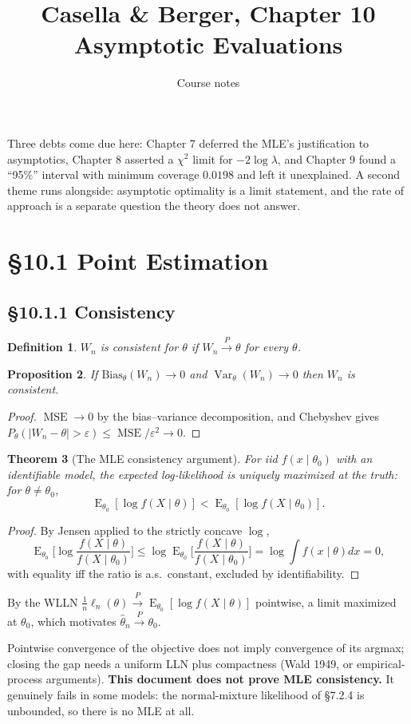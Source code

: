 \documentclass[11pt]{article}
\title{Casella \& Berger, Chapter 10\\[2pt]\large Asymptotic Evaluations}
\author{Course notes}\date{}
\newtheorem{theorem}{Theorem}[section]
\newtheorem{definition}[theorem]{Definition}
\newtheorem{proposition}[theorem]{Proposition}
\DeclareMathOperator{\Var}{Var}\DeclareMathOperator{\E}{E}
\DeclareMathOperator{\MSE}{MSE}
\newcommand{\convP}{\xrightarrow{P}}\newcommand{\convD}{\xrightarrow{d}}
\begin{document}
\maketitle

Three debts come due here: Chapter 7 deferred the MLE's justification to asymptotics, Chapter 8 asserted a $\chi^2$ limit for $-2\log\lambda$, and Chapter 9 found a ``95\%'' interval with minimum coverage $0.0198$ and left it unexplained. A second theme runs alongside: asymptotic optimality is a limit statement, and the rate of approach is a separate question the theory does not answer.

\section{\S10.1 Point Estimation}
\subsection{\S10.1.1 Consistency}
\begin{definition}
$W_n$ is consistent for $\theta$ if $W_n\convP\theta$ for every $\theta$.
\end{definition}
\begin{proposition}
If $\mathrm{Bias}_\theta(W_n)\to0$ and $\Var_\theta(W_n)\to0$ then $W_n$ is consistent.
\end{proposition}
\begin{proof}
$\MSE\to0$ by the bias--variance decomposition, and Chebyshev gives $P_\theta(|W_n-\theta|>\varepsilon)\le\MSE/\varepsilon^2\to0$.
\end{proof}
\begin{theorem}[The MLE consistency argument]
For iid $f(x\mid\theta_0)$ with an identifiable model, the expected log-likelihood is uniquely maximized at the truth: for $\theta\ne\theta_0$,
\[\E_{\theta_0}[\log f(X\mid\theta)]<\E_{\theta_0}[\log f(X\mid\theta_0)].\]
\end{theorem}
\begin{proof}
By Jensen applied to the strictly concave $\log$,
\[\E_{\theta_0}\Big[\log\frac{f(X\mid\theta)}{f(X\mid\theta_0)}\Big]\le\log\E_{\theta_0}\Big[\frac{f(X\mid\theta)}{f(X\mid\theta_0)}\Big]=\log\int f(x\mid\theta)dx=0,\]
with equality iff the ratio is a.s.\ constant, excluded by identifiability.
\end{proof}
By the WLLN $\frac1n\ell_n(\theta)\convP\E_{\theta_0}[\log f(X\mid\theta)]$ pointwise, a limit maximized at $\theta_0$, which motivates $\hat\theta_n\convP\theta_0$.
\begin{flagbox}
Pointwise convergence of the objective does not imply convergence of its argmax; closing the gap needs a uniform LLN plus compactness (Wald 1949, or empirical-process arguments). \textbf{This document does not prove MLE consistency.} It genuinely fails in some models: the normal-mixture likelihood of \S7.2.4 is unbounded, so there is no MLE at all.
\end{flagbox}
\end{document}
